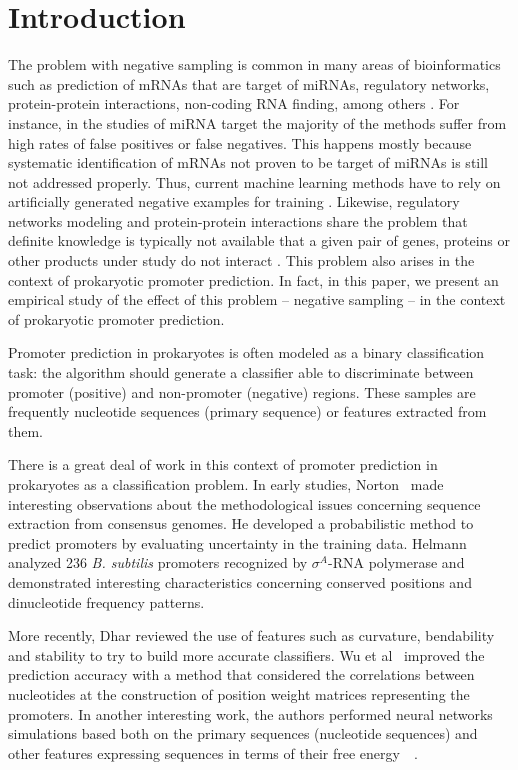 \documentclass[conference,letterpaper]{IEEEtran}
\begin{document}
\section{Introduction}
\label{sec:intro}

The problem with negative sampling is common in many areas of bioinformatics such as prediction of mRNAs that are target of miRNAs, regulatory networks, protein-protein interactions, non-coding RNA finding, among others \cite{bandyopadhyay2009,cerulo2010,park2011,wang2006}. For instance, in the studies of miRNA target the majority of the methods suffer from high rates of false positives or false negatives. This happens mostly because systematic identification of mRNAs not proven to be target of miRNAs is still not addressed properly. Thus, current machine learning methods have to rely on artificially generated negative examples for training \cite{bandyopadhyay2009}. Likewise, regulatory networks modeling and protein-protein interactions share the problem that definite knowledge is typically not available that a given pair of genes, proteins or other products under study do not interact \cite{cerulo2010,park2011}. This problem  also arises in the context of prokaryotic promoter prediction.  In fact, in this paper, we present an empirical study of the effect of this problem -- negative sampling -- in the context of prokaryotic promoter prediction.

Promoter prediction in prokaryotes is often modeled as a binary classification task: the algorithm should generate a classifier able to discriminate between promoter (positive) and non-promoter (negative) regions. These samples are frequently nucleotide sequences (primary sequence) or features extracted from them. 

There is a great deal of work in this context of promoter prediction in prokaryotes as a classification problem. In early studies, Norton~\cite{norton1994} made interesting observations about the methodological issues concerning sequence extraction from consensus genomes. He developed a probabilistic method to predict promoters by evaluating uncertainty in the training data. Helmann~\cite{helmann1995} analyzed 236 {\it B. subtilis} promoters recognized by ${\sigma }^{{A}}$-RNA polymerase and demonstrated interesting characteristics concerning conserved positions and dinucleotide frequency patterns. 

More recently, Dhar \cite{dhar2010} reviewed the use of features such as curvature, bendability and stability to try to build more accurate classifiers. Wu et al~\cite{wu2011} improved the prediction accuracy with a method that considered the correlations between nucleotides at the construction of position weight matrices representing the promoters. In another interesting work, the authors performed neural networks simulations based both on the primary sequences (nucleotide sequences) and other features expressing sequences in terms of their free energy~~\cite{avila2011}.
\end{document}
